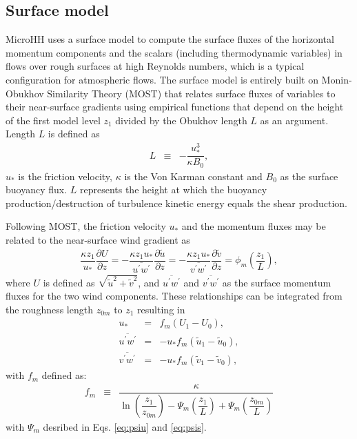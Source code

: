 \documentclass[gmd]{copernicus}
\newcommand{\uf}{\ensuremath{\widetilde{u}}}
\newcommand{\vf}{\ensuremath{\widetilde{v}}}
\begin{document}
\subsection{Surface model}\label{sec:surface_model}
MicroHH uses a surface model to compute the surface fluxes of the horizontal momentum components and the scalars (including thermodynamic variables) in flows over rough surfaces at high Reynolds numbers, which is a typical configuration for atmospheric flows. The surface model is entirely built on Monin-Obukhov Similarity Theory (MOST) that relates surface fluxes of variables to their near-surface gradients using empirical functions that depend on the height of the first model level $z_1$ divided by the Obukhov length $L$ as an argument. Length $L$ is defined as
\begin{eqnarray}
L   & \equiv & - \dfrac{u_*^3}{\kappa B_0},
\end{eqnarray}
$u_*$ is the friction velocity, $\kappa$ is the Von Karman constant and $B_0$ as the surface buoyancy flux. $L$ represents the height at which the buoyancy production/destruction of turbulence kinetic energy equals the shear production.

Following MOST, the friction velocity $u_*$ and the momentum fluxes may be related to the near-surface wind gradient as
\begin{eqnarray}
\dfrac{\kappa z_1}{u_*} \dfrac{\partial U}{\partial z}  = 
- \dfrac{\kappa z_1 u_*}{\overline{u^\prime w^\prime}} \dfrac{\partial \uf}{\partial z} =
- \dfrac{\kappa z_1 u_*}{\overline{v^\prime w^\prime}} \dfrac{\partial \vf}{\partial z} =
\phi_m \left( \dfrac{z_1}{L} \right),\label{eq:surf_grad}
\end{eqnarray}
where $U$ is defined as $\sqrt{\uf^2 + \vf^2}$, and $\overline{u^\prime w^\prime}$ and $\overline{v^\prime w^\prime}$ as the surface momentum fluxes for the two wind components. These relationships can be integrated from the roughness length $z_{0m}$ to $z_1$ resulting in 
\begin{eqnarray}
u_* & =  & f_m \left( U_1 - U_0 \right),\\
\overline{u^\prime w^\prime} & = & - u_* f_m \left( \uf_1 - \uf_0 \right),\\
\overline{v^\prime w^\prime} & = & - u_* f_m \left( \vf_1 - \vf_0 \right),
\end{eqnarray}
with $f_m$ defined as:
\begin{eqnarray}
f_m & \equiv & \dfrac{\kappa}
{ \ln{\left( \dfrac{z_1}{z_{0m}} \right)}
	- \varPsi_m \left( \dfrac{z_1}{L} \right)
	+ \varPsi_m \left( \dfrac{z_{0m}}{L} \right) }
\end{eqnarray}
with $\varPsi_m$ desribed in Eqs. \ref{eq:psiu} and \ref{eq:psis}.
\end{document}
